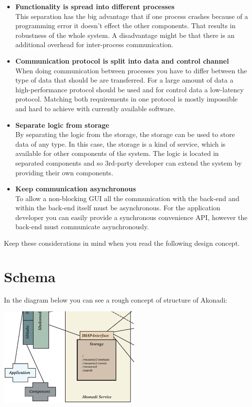 \documentclass[]{report}
\begin{document}
\begin{itemize}
  \item \textbf{Functionality is spread into different processes}\\
        This separation has the big advantage that if one process crashes because of
        a programming error it doesn't effect the other components. That results in
        robustness of the whole system. A disadvantage might be that there is an additional
        overhead for inter-process communication.
  \item \textbf{Communication protocol is split into data and control channel}\\
        When doing communication between processes you have to differ between the type of data
        that should be are transferred. For a large amount of data a high-performance
        protocol should be used and for control data a low-latency protocol.
        Matching both requirements in one protocol is mostly impossible and hard to
        achieve with currently available software.
  \item \textbf{Separate logic from storage}\\
        By separating the logic from the storage, the storage can be used to store data
        of any type. In this case, the storage is a kind of service, which is available for
        other components of the system. The logic is located in separated components and so
        3rd-party developer can extend the system by providing their own components.
  \item \textbf{Keep communication asynchronous}\\
        To allow a non-blocking GUI all the communication with the back-end and within the
        back-end itself must be asynchronous. For the application developer you can easily
        provide a synchronous convenience API, however the back-end must communicate asynchronously.
\end{itemize}

Keep these considerations in mind when you read the following design concept.

\section{Schema}

In the diagram below you can see a rough concept of structure of Akonadi:

\vspace{2cm}
\begin{minipage}{5cm}
\includegraphics[height=5cm]{pics/concept.eps}
\end{minipage}
\end{document}
